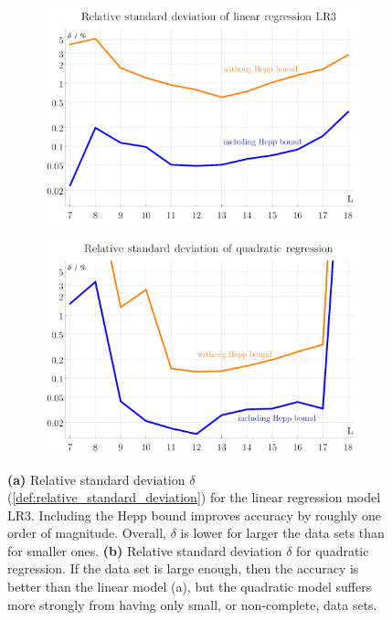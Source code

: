 \documentclass[11pt]{scrartcl}
\numberwithin{equation}{section}
\begin{document}
\begin{figure}[htb]
	
	\begin{subfigure}{ .49 \linewidth}
		\centering
		\includegraphics[width=\linewidth]{figures/LR3_delta}
		\subcaption{}
		\label{fig:LR3_delta}
	\end{subfigure}
	\begin{subfigure}{ .49 \linewidth}
		\centering
		\includegraphics[width=\linewidth]{figures/QR_delta}
		\subcaption{}
		\label{fig:QR_delta}
	\end{subfigure}
	\caption{ 
		\textbf{(a)}  Relative standard deviation $\delta$ (\cref{def:relative_standard_deviation}) for the linear regression model LR3. Including the Hepp bound improves accuracy by roughly one order of magnitude. Overall, $\delta$ is lower for larger the data sets than for smaller ones. 
		\textbf{(b)} Relative standard deviation $\delta$ for quadratic regression. If the data set is large enough, then the accuracy is   better than the linear model (a), but the quadratic model suffers more strongly from having only small, or non-complete, data sets. }
	\label{fig:regression}
\end{figure}
\end{document}
